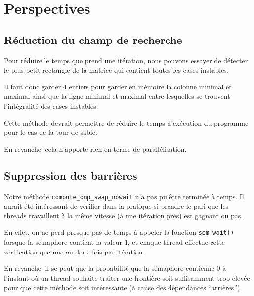 \section{Perspectives}

\subsection{Réduction du champ de recherche}

Pour réduire le temps que prend une itération, nous pouvons essayer de
détecter le plus petit rectangle de la matrice qui contient toutes les
cases instables.

Il faut donc garder 4 entiers pour garder en mémoire la colonne
minimal et maximal ainsi que la ligne minimal et maximal entre
lesquelles se trouvent l'intégralité des cases instables.

Cette méthode devrait permettre de réduire le temps d'exécution du
programme pour le cas de la tour de sable.

En revanche, cela n'apporte rien en terme de parallélisation.

\subsection{Suppression des barrières}

Notre méthode \texttt{compute\_omp\_swap\_nowait} n'a pas pu être
terminée à temps. Il aurait été intéressant de vérifier dans la
pratique si prendre le pari que les threads travaillent à la même
vitesse (à une itération près) est gagnant ou pas.

En effet, on ne perd presque pas de temps à appeler la fonction
\texttt{sem\_wait()} lorsque la sémaphore contient la valeur 1, et
chaque thread effectue cette vérification que une ou deux fois par
itération.

En revanche, il se peut que la probabilité que la sémaphore contienne
0 à l'instant où un thread souhaite traiter une frontière soit
suffisamment trop élevée pour que cette méthode soit intéressante (à cause des dépendances ``arrières'').
